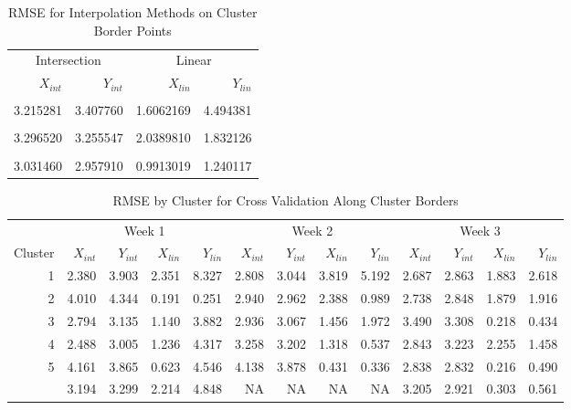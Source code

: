 \documentclass[12pt]{article}
\begin{document}
\begin{table}

\caption{\label{tab:border-cv-rmse}RMSE for Interpolation Methods on Cluster Border Points}
\centering
\begin{tabular}[t]{rrrr}
\toprule
\multicolumn{2}{c}{Intersection} & \multicolumn{2}{c}{Linear} \\
\cmidrule(l{3pt}r{3pt}){1-2} \cmidrule(l{3pt}r{3pt}){3-4}
$X_{int}$ & $Y_{int}$ & $X_{lin}$ & $Y_{lin}$\\
\midrule
\addlinespace[0.3em]
\multicolumn{4}{l}{\textbf{Week 1}}\\
\hspace{1em}3.215281 & 3.407760 & 1.6062169 & 4.494381\\
\addlinespace[0.3em]
\multicolumn{4}{l}{\textbf{Week 2}}\\
\hspace{1em}3.296520 & 3.255547 & 2.0389810 & 1.832126\\
\addlinespace[0.3em]
\multicolumn{4}{l}{\textbf{Week 3}}\\
\hspace{1em}3.031460 & 2.957910 & 0.9913019 & 1.240117\\
\bottomrule
\end{tabular}
\end{table}

\begin{table}

\caption{\label{tab:border-clust-tab}RMSE by Cluster for Cross Validation Along Cluster Borders}
\centering
\begin{tabular}[t]{rrrrrrrrrrrrr}
\toprule
\multicolumn{1}{c}{ } & \multicolumn{4}{c}{Week 1} & \multicolumn{4}{c}{Week 2} & \multicolumn{4}{c}{Week 3} \\
\cmidrule(l{3pt}r{3pt}){2-5} \cmidrule(l{3pt}r{3pt}){6-9} \cmidrule(l{3pt}r{3pt}){10-13}
Cluster & $X_{int}$ & $Y_{int}$ & $X_{lin}$ & $Y_{lin}$ & $X_{int}$ & $Y_{int}$ & $X_{lin}$ & $Y_{lin}$ & $X_{int}$ & $Y_{int}$ & $X_{lin}$ & $Y_{lin}$\\
\midrule
1 & 2.380 & 3.903 & 2.351 & 8.327 & 2.808 & 3.044 & 3.819 & 5.192 & 2.687 & 2.863 & 1.883 & 2.618\\
2 & 4.010 & 4.344 & 0.191 & 0.251 & 2.940 & 2.962 & 2.388 & 0.989 & 2.738 & 2.848 & 1.879 & 1.916\\
3 & 2.794 & 3.135 & 1.140 & 3.882 & 2.936 & 3.067 & 1.456 & 1.972 & 3.490 & 3.308 & 0.218 & 0.434\\
4 & 2.488 & 3.005 & 1.236 & 4.317 & 3.258 & 3.202 & 1.318 & 0.537 & 2.843 & 3.223 & 2.255 & 1.458\\
5 & 4.161 & 3.865 & 0.623 & 4.546 & 4.138 & 3.878 & 0.431 & 0.336 & 2.838 & 2.832 & 0.216 & 0.490\\
\addlinespace
6 & 3.194 & 3.299 & 2.214 & 4.848 & NA & NA & NA & NA & 3.205 & 2.921 & 0.303 & 0.561\\
\bottomrule
\end{tabular}
\end{table}
\end{document}

